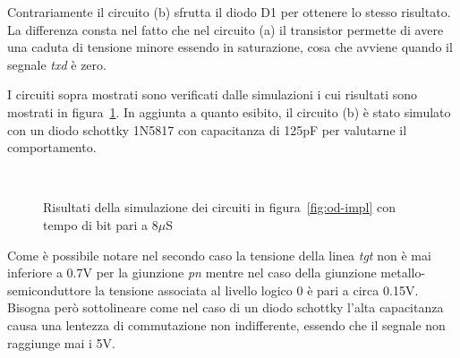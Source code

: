 Contrariamente il circuito (b) sfrutta il diodo D1 per ottenere lo stesso risultato. La differenza consta nel fatto che nel circuito (a) il transistor permette di avere una caduta di tensione minore essendo in saturazione, cosa che avviene quando il segnale \textit{txd} è zero.

I circuiti sopra mostrati sono verificati dalle simulazioni i cui risultati sono mostrati in figura~\ref{graph:sim}. In aggiunta a quanto esibito, il circuito (b) è stato simulato con un diodo schottky 1N5817 con capacitanza di 125pF per valutarne il comportamento.

\begin{figure}
    \centering
        \\
        \vfill
    \caption[]{Risultati della simulazione dei circuiti in figura~\ref{fig:od-impl} con tempo di bit pari a 8\(\mu\)S}\label{graph:sim}
\end{figure}

Come è possibile notare nel secondo caso la tensione della linea \textit{tgt} non è mai inferiore a 0.7V per la giunzione \textit{pn} mentre nel caso della giunzione metallo-semiconduttore la tensione associata al livello logico 0 è pari a circa 0.15V. Bisogna però sottolineare come nel caso di un diodo schottky l'alta capacitanza causa una lentezza di commutazione non indifferente, essendo che il segnale non raggiunge mai i 5V. 



